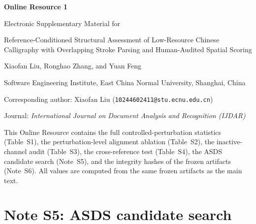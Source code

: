 \documentclass[pdflatex,sn-basic,Numbered]{sn-jnl}
\begin{document}
\begin{center}
{\Large\bfseries Online Resource 1\par}
\vspace{0.3em}
{\normalsize Electronic Supplementary Material for\par}
\vspace{0.5em}
{\large Reference-Conditioned Structural Assessment of Low-Resource Chinese
Calligraphy with Overlapping Stroke Parsing and Human-Audited Spatial
Scoring\par}
\vspace{0.5em}
Xiaofan Liu, Ronghao Zhang, and Yuan Feng\par
Software Engineering Institute, East China Normal University, Shanghai,
China\par
Corresponding author: Xiaofan Liu
(\texttt{10244602411@stu.ecnu.edu.cn})\par
Journal: \textit{International Journal on Document Analysis and Recognition
(IJDAR)}
\end{center}

\setcounter{table}{0}
\renewcommand{\thetable}{S\arabic{table}}

\noindent This Online Resource contains the full controlled-perturbation statistics
(Table~S1), the perturbation-level alignment ablation (Table~S2), the
inactive-channel audit (Table~S3), the cross-reference test (Table~S4), the
ASDS candidate search (Note~S5), and the integrity hashes of the frozen
artifacts (Note~S6). All
values are computed from the same frozen artifacts as the main text.






\section*{Note S5: ASDS candidate search}
\end{document}

